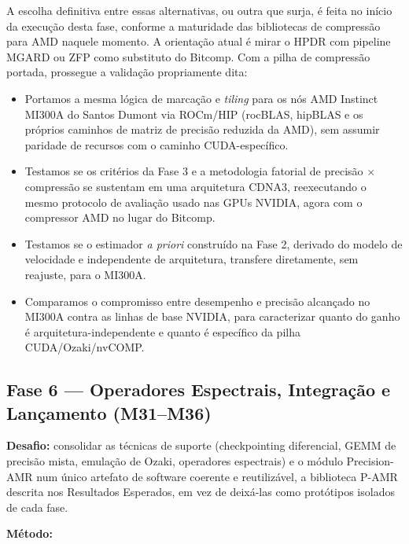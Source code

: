 \documentclass[12pt,a4paper]{article}
\begin{document}
A escolha definitiva entre essas alternativas, ou outra que surja, é feita
no início da execução desta fase, conforme a maturidade das bibliotecas de
compressão para AMD naquele momento. A orientação atual é mirar o HPDR com
pipeline MGARD ou ZFP como substituto do Bitcomp. Com a pilha de compressão
portada, prossegue a validação propriamente dita:

\begin{itemize}
  \item Portamos a mesma lógica de marcação e \emph{tiling} para os nós AMD
        Instinct MI300A do Santos Dumont via ROCm/HIP (rocBLAS, hipBLAS e
        os próprios caminhos de matriz de precisão reduzida da AMD), sem
        assumir paridade de recursos com o caminho CUDA-específico.
  \item Testamos se os critérios da Fase 3 e a metodologia fatorial de
        precisão $\times$ compressão se sustentam em uma arquitetura CDNA3,
        reexecutando o mesmo protocolo de avaliação usado nas GPUs NVIDIA,
        agora com o compressor AMD no lugar do Bitcomp.
  \item Testamos se o estimador \emph{a priori} construído na Fase 2,
        derivado do modelo de velocidade e independente de arquitetura,
        transfere diretamente, sem reajuste, para o MI300A.
  \item Comparamos o compromisso entre desempenho e precisão alcançado no
        MI300A contra as linhas de base NVIDIA, para caracterizar quanto
        do ganho é arquitetura-independente e quanto é específico da pilha
        CUDA/Ozaki/nvCOMP.
\end{itemize}

\subsection{Fase 6 --- Operadores Espectrais, Integração e Lançamento
(M31--M36)}

\textbf{Desafio:} consolidar as técnicas de suporte (checkpointing
diferencial, GEMM de precisão mista, emulação de Ozaki, operadores
espectrais) e o módulo Precision-AMR num único artefato de software
coerente e reutilizável, a biblioteca P-AMR descrita nos Resultados
Esperados, em vez de deixá-las como protótipos isolados de cada fase.

\textbf{Método:}
\end{document}
